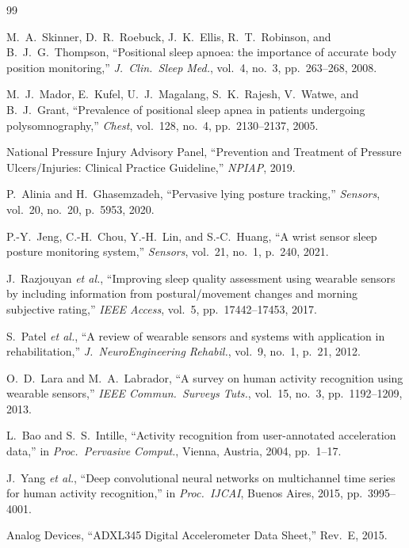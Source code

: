 \documentclass[journal]{IEEEtran}
\begin{document}
\begin{thebibliography}{99}

M.~A.~Skinner, D.~R.~Roebuck, J.~K.~Ellis, R.~T.~Robinson, and
B.~J.~G.~Thompson,
``Positional sleep apnoea: the importance of accurate body position
monitoring,''
\textit{J.~Clin.~Sleep Med.}, vol.~4, no.~3, pp.~263--268, 2008.

M.~J.~Mador, E.~Kufel, U.~J.~Magalang, S.~K.~Rajesh, V.~Watwe, and
B.~J.~Grant,
``Prevalence of positional sleep apnea in patients undergoing
polysomnography,''
\textit{Chest}, vol.~128, no.~4, pp.~2130--2137, 2005.

National Pressure Injury Advisory Panel,
``Prevention and Treatment of Pressure Ulcers/Injuries: Clinical
Practice Guideline,'' \textit{NPIAP}, 2019.

P.~Alinia and H.~Ghasemzadeh,
``Pervasive lying posture tracking,''
\textit{Sensors}, vol.~20, no.~20, p.~5953, 2020.

P.-Y.~Jeng, C.-H.~Chou, Y.-H.~Lin, and S.-C.~Huang,
``A wrist sensor sleep posture monitoring system,''
\textit{Sensors}, vol.~21, no.~1, p.~240, 2021.

J.~Razjouyan \textit{et al.},
``Improving sleep quality assessment using wearable sensors by including
information from postural/movement changes and morning subjective rating,''
\textit{IEEE Access}, vol.~5, pp.~17442--17453, 2017.

S.~Patel \textit{et al.},
``A review of wearable sensors and systems with application in
rehabilitation,''
\textit{J.~NeuroEngineering Rehabil.}, vol.~9, no.~1, p.~21, 2012.

O.~D.~Lara and M.~A.~Labrador,
``A survey on human activity recognition using wearable sensors,''
\textit{IEEE Commun.~Surveys Tuts.}, vol.~15, no.~3, pp.~1192--1209, 2013.

L.~Bao and S.~S.~Intille,
``Activity recognition from user-annotated acceleration data,''
in \textit{Proc.~Pervasive Comput.}, Vienna, Austria, 2004, pp.~1--17.

J.~Yang \textit{et al.},
``Deep convolutional neural networks on multichannel time series for
human activity recognition,''
in \textit{Proc.~IJCAI}, Buenos Aires, 2015, pp.~3995--4001.

Analog Devices,
``ADXL345 Digital Accelerometer Data Sheet,'' Rev.~E, 2015.

\end{thebibliography}
\end{document}
